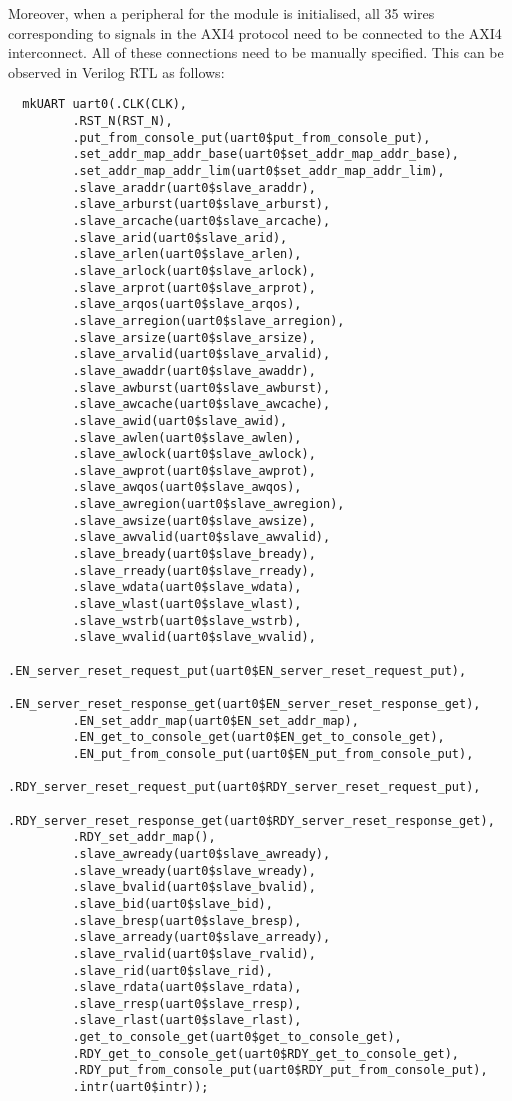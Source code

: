 \documentclass[a4paper,8pt]{report}
\begin{document}
Moreover, when a peripheral for the module is initialised, all 35 wires
corresponding to signals in the AXI4 protocol need to be connected to the AXI4
interconnect. All of these connections need to be manually specified. This can
be observed in Verilog RTL as follows:
\tiny
\begin{verbatim}
  mkUART uart0(.CLK(CLK),
         .RST_N(RST_N),
         .put_from_console_put(uart0$put_from_console_put),
         .set_addr_map_addr_base(uart0$set_addr_map_addr_base),
         .set_addr_map_addr_lim(uart0$set_addr_map_addr_lim),
         .slave_araddr(uart0$slave_araddr),
         .slave_arburst(uart0$slave_arburst),
         .slave_arcache(uart0$slave_arcache),
         .slave_arid(uart0$slave_arid),
         .slave_arlen(uart0$slave_arlen),
         .slave_arlock(uart0$slave_arlock),
         .slave_arprot(uart0$slave_arprot),
         .slave_arqos(uart0$slave_arqos),
         .slave_arregion(uart0$slave_arregion),
         .slave_arsize(uart0$slave_arsize),
         .slave_arvalid(uart0$slave_arvalid),
         .slave_awaddr(uart0$slave_awaddr),
         .slave_awburst(uart0$slave_awburst),
         .slave_awcache(uart0$slave_awcache),
         .slave_awid(uart0$slave_awid),
         .slave_awlen(uart0$slave_awlen),
         .slave_awlock(uart0$slave_awlock),
         .slave_awprot(uart0$slave_awprot),
         .slave_awqos(uart0$slave_awqos),
         .slave_awregion(uart0$slave_awregion),
         .slave_awsize(uart0$slave_awsize),
         .slave_awvalid(uart0$slave_awvalid),
         .slave_bready(uart0$slave_bready),
         .slave_rready(uart0$slave_rready),
         .slave_wdata(uart0$slave_wdata),
         .slave_wlast(uart0$slave_wlast),
         .slave_wstrb(uart0$slave_wstrb),
         .slave_wvalid(uart0$slave_wvalid),
         .EN_server_reset_request_put(uart0$EN_server_reset_request_put),
         .EN_server_reset_response_get(uart0$EN_server_reset_response_get),
         .EN_set_addr_map(uart0$EN_set_addr_map),
         .EN_get_to_console_get(uart0$EN_get_to_console_get),
         .EN_put_from_console_put(uart0$EN_put_from_console_put),
         .RDY_server_reset_request_put(uart0$RDY_server_reset_request_put),
         .RDY_server_reset_response_get(uart0$RDY_server_reset_response_get),
         .RDY_set_addr_map(),
         .slave_awready(uart0$slave_awready),
         .slave_wready(uart0$slave_wready),
         .slave_bvalid(uart0$slave_bvalid),
         .slave_bid(uart0$slave_bid),
         .slave_bresp(uart0$slave_bresp),
         .slave_arready(uart0$slave_arready),
         .slave_rvalid(uart0$slave_rvalid),
         .slave_rid(uart0$slave_rid),
         .slave_rdata(uart0$slave_rdata),
         .slave_rresp(uart0$slave_rresp),
         .slave_rlast(uart0$slave_rlast),
         .get_to_console_get(uart0$get_to_console_get),
         .RDY_get_to_console_get(uart0$RDY_get_to_console_get),
         .RDY_put_from_console_put(uart0$RDY_put_from_console_put),
         .intr(uart0$intr));
\end{verbatim}
\normalsize
\end{document}

